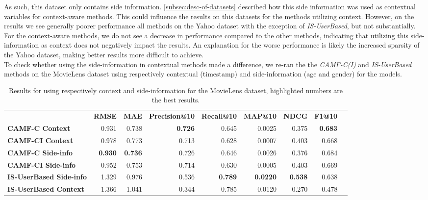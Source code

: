 As such, this dataset only contains side information.
\autoref{subsec:desc-of-datasets} described how this side information was used as contextual variables for context-aware methods.
This could influence the results on this datasets for the methods utilizing context.
However, on the results we see generally poorer performance all methods on the Yahoo dataset with the exception of \textit{IS-UserBased}, but not substantially.
For the context-aware methods, we do not see a decrease in performance compared to the other methods, indicating that utilizing this side-information as context does not negatively impact the results.
An explanation for the worse performance is likely the increased sparsity of the Yahoo dataset, making better results more difficult to achieve.\\
To check whether using the side-information in contextual methods made a difference, we re-ran the the \textit{CAMF-C(I)} and \textit{IS-UserBased} methods on the MovieLens dataset using respectively contextual (timestamp) and side-information (age and gender) for the models.
\begin{table*}[!htp]\centering
    \caption{Results for using respectively context and side-information for the MovieLens dataset, highlighted numbers are the best results.}\label{tab:movielenscontextsideinfo}
    \scriptsize
    \begin{tabular}{lrrrrrrrr}\toprule
    &\textbf{RMSE} &\textbf{MAE} &\textbf{Precision@10} &\textbf{Recall@10} &\textbf{MAP@10} &\textbf{NDCG} &\textbf{F1@10} \\\cmidrule{2-8}
    \textbf{CAMF-C Context} &0.931 &0.738 &\textbf{0.726} &0.645 &0.0025 &0.375 &\textbf{0.683} \\\cmidrule{1-8}
    \textbf{CAMF-CI Context} &0.978 &0.773 &0.713 &0.628 &0.0007 &0.403 &0.668 \\\cmidrule{1-8}
    \textbf{CAMF-C Side-info} &\textbf{0.930} &\textbf{0.736} &0.726 &0.646 &0.0026 &0.376 &0.684 \\\cmidrule{1-8}
    \textbf{CAMF-CI Side-info} &0.952 &0.753 &0.714 &0.630 &0.0005 &0.403 &0.669 \\\cmidrule{1-8}
    \textbf{IS-UserBased Side-info} &1.329 &0.976 &0.536 &\textbf{0.789} &\textbf{0.0220} &\textbf{0.538} &0.638 \\\cmidrule{1-8}
    \textbf{IS-UserBased Context} &1.366 &1.041 &0.344 &0.785 &0.0120 &0.270 &0.478 \\\cmidrule{1-8}
    \bottomrule
    \end{tabular}
\end{table*}
